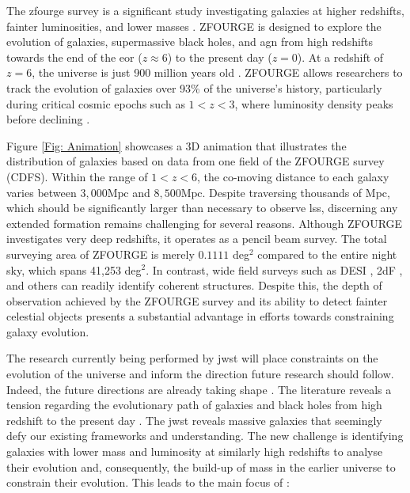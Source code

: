 The \gls{zfourge} survey is a significant study investigating galaxies at higher redshifts, fainter luminosities, and lower masses \citep{straatman_fourstar_2016}. ZFOURGE is designed to explore the evolution of galaxies, supermassive black holes, and \gls{agn} from high redshifts towards the end of the \gls{eor} ($z \approx 6$) to the present day ($z=0$). At a redshift of $z=6$, the universe is just 900 million years old \citep{astropy_collaboration_astropy_2022}. ZFOURGE allows researchers to track the evolution of galaxies over 93\% of the universe's history, particularly during critical cosmic epochs such as $1 < z < 3$, where luminosity density peaks before declining \citep{assef_mid-ir-_2011, gruppioni_modelling_2011, wylezalek_galaxy_2014, madau_cosmic_2014}. 

Figure \ref{Fig: Animation} showcases a 3D animation that illustrates the distribution of galaxies based on data from one field of the ZFOURGE survey (CDFS). Within the range of $1<z<6$, the co-moving distance to each galaxy varies between $3,000 \mathrm{Mpc}$ and $8,500 \mathrm{Mpc}$. Despite traversing thousands of Mpc, which should be significantly larger than necessary to observe \gls{lss}, discerning any extended formation remains challenging for several reasons. Although ZFOURGE investigates very deep redshifts, it operates as a pencil beam survey. The total surveying area of ZFOURGE is merely $0.1111$ deg$^2$ compared to the entire night sky, which spans 41,253 deg$^2$. In contrast, wide field surveys such as DESI \citep{desi_collaboration_desi_2016, desi_collaboration_desi_2024}, 2dF \citep{sadler_radio_2002, beutler_6df_2011}, and others \citep{mcgreer_discovery_2006, stevans_bridging_2018} can readily identify coherent structures. Despite this, the depth of observation achieved by the ZFOURGE survey and its ability to detect fainter celestial objects presents a substantial advantage in efforts towards constraining galaxy evolution.

The research currently being performed by \gls{jwst} will place constraints on the evolution of the universe and inform the direction future research should follow. Indeed, the future directions are already taking shape \citep{labbe_population_2023}. The literature reveals a tension regarding the evolutionary path of galaxies and black holes from high redshift to the present day \citep{ziparo_primordial_2024}. The \gls{jwst} reveals massive galaxies that seemingly defy our existing frameworks and understanding. The new challenge is identifying galaxies with lower mass and luminosity at similarly high redshifts to analyse their evolution and, consequently, the build-up of mass in the earlier universe to constrain their evolution. This leads to the main focus of \cite{lyon_decomposing_2024}: